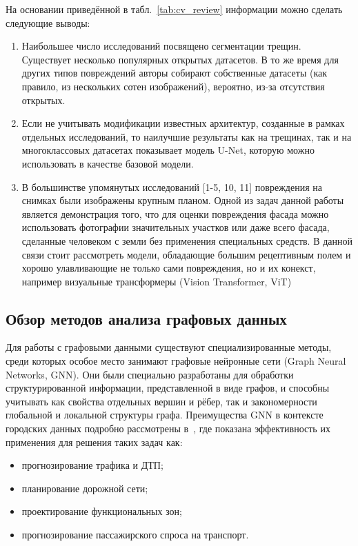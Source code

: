 \documentclass[14pt]{extarticle}
\begin{document}
На основании приведённой в табл.~\ref{tab:cv_review} информации можно сделать
следующие выводы:
\begin{enumerate}[leftmargin=*, label=\arabic*.]
    \item Наибольшее число исследований посвящено сегментации трещин.
          Существует несколько популярных открытых датасетов. В то же время
          для других типов повреждений авторы собирают собственные датасеты
          (как правило, из нескольких сотен изображений), вероятно, из-за
          отсутствия открытых.
    \item Если не учитывать модификации известных архитектур, созданные в
          рамках отдельных исследований, то наилучшие результаты как на
          трещинах, так и на многоклассовых датасетах показывает модель U-Net,
          которую можно использовать в качестве базовой модели.
    \item В большинстве упомянутых исследований [1-5, 10, 11] повреждения на снимках были изображены крупным планом. Одной из задач данной работы является демонстрация того, что для оценки повреждения фасада можно использовать фотографии значительных участков или даже всего фасада, сделанные человеком с земли без применения специальных средств. В данной связи стоит рассмотреть модели, обладающие большим рецептивным полем и хорошо улавливающие не только сами повреждения, но и их конекст, например визуальные трансформеры (Vision Transformer, ViT)
\end{enumerate}

\subsection{Обзор методов анализа графовых данных}
\label{subsec:gnn_review}

Для работы с графовыми данными существуют специализированные методы, среди
которых особое место занимают графовые нейронные сети (Graph Neural Networks, GNN). Они были специально
разработаны для обработки структурированной информации, представленной в виде
графов, и способны учитывать как свойства отдельных вершин и рёбер, так
и закономерности глобальной и локальной структуры графа. Преимущества GNN
в контексте городских данных подробно рассмотрены в~\cite{wu2022gnn}, где
показана эффективность их применения для решения таких задач как:
\begin{itemize}[leftmargin=*]
    \item прогнозирование трафика и ДТП;
    \item планирование дорожной сети;
    \item проектирование функциональных зон;
    \item прогнозирование пассажирского спроса на транспорт.
\end{itemize}
\end{document}
